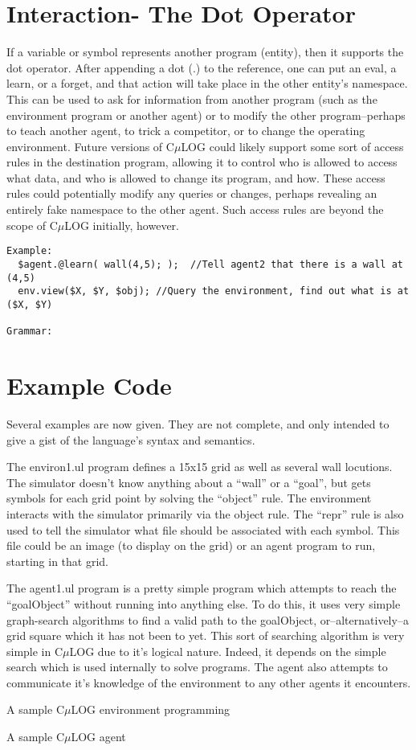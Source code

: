 \documentclass[onecolumn,titlepage]{article}
\def\sourcetabsize{4}
\newenvironment{sourcestyle}{\begin{scriptsize}}{\end{scriptsize}}
\def\sourceinput#1{\par\begin{sourcestyle}\verbatimtabinput[\sourcetabsize]{#1}\end{sourcestyle}\par}
\begin{document}
\section{Interaction- The Dot Operator}
If a variable or symbol represents another program (entity), then it supports
the dot operator.  After appending a dot (.) to the reference, one can put
an eval, a learn, or a forget, and that action will take place in the other
entity's namespace.  This can be used to ask for information from another program
(such as the environment program or another agent) or to modify the other
program--perhaps to teach another agent, to trick a competitor, or to change
the operating environment.  Future versions of C$\mu$LOG could likely support
some sort of access rules in the destination program, allowing it to control who is
allowed to access what data, and who is allowed to change its program, and how.
These access rules could potentially modify any queries or changes, perhaps
revealing an entirely fake namespace to the other agent.  Such access rules are
beyond the scope of C$\mu$LOG initially, however.
\begin{verbatim}
Example:
  $agent.@learn( wall(4,5); );  //Tell agent2 that there is a wall at (4,5)
  env.view($X, $Y, $obj); //Query the environment, find out what is at ($X, $Y)

Grammar:
\end{verbatim}

\section{Example Code}
Several examples are now given.  They are not complete, and only intended
to give a gist of the language's syntax and semantics.

The environ1.ul program defines a 15x15 grid as well as several wall locutions.
The simulator doesn't know anything about a ``wall'' or a ``goal'', but gets
symbols for each grid point by solving the ``object'' rule.  The environment
interacts with the simulator primarily via the object rule.  The ``repr'' rule
is also used to tell the simulator what file should be associated with each
symbol.  This file could be an image (to display on the grid) or an agent program
to run, starting in that grid.

The agent1.ul program is a pretty simple program which attempts to reach the ``goalObject''
without running into anything else. To do this, it uses very simple graph-search 
algorithms to find a valid path to the goalObject, or--alternatively--a grid square
which it has not been to yet.  This sort of searching algorithm is very simple in
C$\mu$LOG due to it's logical nature.  Indeed, it depends on the simple search 
which is used internally to solve programs.  The agent also attempts to communicate it's 
knowledge of the environment to any other agents it encounters.


\begin{program}
\begin{multicols}{2}
\sourceinput{samples/environ1.ul}
\end{multicols}
\caption{A sample C$\mu$LOG environment programming}
\end{program}

\begin{program}
\begin{multicols}{2}
\sourceinput{samples/agent1.ul}
\end{multicols}
\caption{A sample C$\mu$LOG agent}
\end{program}
\end{document}
